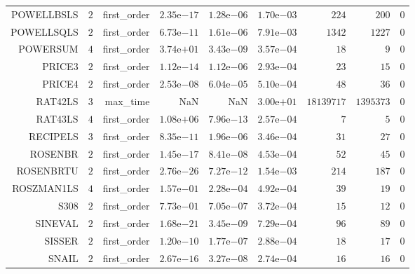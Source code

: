 \begin{longtable}{rrrrrrrrr}
POWELLBSLS & \(     2\) & first\_order & \( 2.35\)e\(-17\) & \( 1.28\)e\(-06\) & \( 1.70\)e\(-03\) & \(   224\) & \(   200\) & \(     0\) \\
POWELLSQLS & \(     2\) & first\_order & \( 6.73\)e\(-11\) & \( 1.61\)e\(-06\) & \( 7.91\)e\(-03\) & \(  1342\) & \(  1227\) & \(     0\) \\
POWERSUM & \(     4\) & first\_order & \( 3.74\)e\(+01\) & \( 3.43\)e\(-09\) & \( 3.57\)e\(-04\) & \(    18\) & \(     9\) & \(     0\) \\
PRICE3 & \(     2\) & first\_order & \( 1.12\)e\(-14\) & \( 1.12\)e\(-06\) & \( 2.93\)e\(-04\) & \(    23\) & \(    15\) & \(     0\) \\
PRICE4 & \(     2\) & first\_order & \( 2.53\)e\(-08\) & \( 6.04\)e\(-05\) & \( 5.10\)e\(-04\) & \(    48\) & \(    36\) & \(     0\) \\
RAT42LS & \(     3\) & max\_time &       NaN &       NaN & \( 3.00\)e\(+01\) & \(18139717\) & \(1395373\) & \(     0\) \\
RAT43LS & \(     4\) & first\_order & \( 1.08\)e\(+06\) & \( 7.96\)e\(-13\) & \( 2.57\)e\(-04\) & \(     7\) & \(     5\) & \(     0\) \\
RECIPELS & \(     3\) & first\_order & \( 8.35\)e\(-11\) & \( 1.96\)e\(-06\) & \( 3.46\)e\(-04\) & \(    31\) & \(    27\) & \(     0\) \\
ROSENBR & \(     2\) & first\_order & \( 1.45\)e\(-17\) & \( 8.41\)e\(-08\) & \( 4.53\)e\(-04\) & \(    52\) & \(    45\) & \(     0\) \\
ROSENBRTU & \(     2\) & first\_order & \( 2.76\)e\(-26\) & \( 7.27\)e\(-12\) & \( 1.54\)e\(-03\) & \(   214\) & \(   187\) & \(     0\) \\
ROSZMAN1LS & \(     4\) & first\_order & \( 1.57\)e\(-01\) & \( 2.28\)e\(-04\) & \( 4.92\)e\(-04\) & \(    39\) & \(    19\) & \(     0\) \\
S308 & \(     2\) & first\_order & \( 7.73\)e\(-01\) & \( 7.05\)e\(-07\) & \( 3.72\)e\(-04\) & \(    15\) & \(    12\) & \(     0\) \\
SINEVAL & \(     2\) & first\_order & \( 1.68\)e\(-21\) & \( 3.45\)e\(-09\) & \( 7.29\)e\(-04\) & \(    96\) & \(    89\) & \(     0\) \\
SISSER & \(     2\) & first\_order & \( 1.20\)e\(-10\) & \( 1.77\)e\(-07\) & \( 2.88\)e\(-04\) & \(    18\) & \(    17\) & \(     0\) \\
SNAIL & \(     2\) & first\_order & \( 2.67\)e\(-16\) & \( 3.27\)e\(-08\) & \( 2.74\)e\(-04\) & \(    16\) & \(    16\) & \(     0\) \\

\end{longtable}
